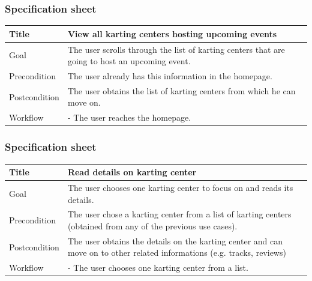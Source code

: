 \documentclass{beamer}
\begin{document}
\begin{frame}
    \frametitle{Specification sheet}
    \begin{table}
        \tiny
        \begin{tabular}{|p{2cm}|p{6cm}|}
        \hline
        Title & \textbf{View all karting centers hosting upcoming events} \\
        \hline
        Goal & The user scrolls through the list of karting centers that are going to host an upcoming event. \\
        \hline
        Precondition & The user already has this information in the homepage.\\
        \hline
        Postcondition & The user obtains the list of karting centers from which he can move on.\\
        \hline
        Workflow &
        - The user reaches the homepage. \\
        \hline
        \end{tabular}
\end{table}
\end{frame}

\begin{frame}
    \frametitle{Specification sheet}
    \begin{table}
        \tiny
        \begin{tabular}{|p{2cm}|p{6cm}|}
        \hline
        Title & \textbf{Read details on karting center} \\
        \hline
        Goal & The user chooses one karting center to focus on and reads its details. \\
        \hline
        Precondition & The user chose a karting center from a list of karting centers (obtained from any of the previous use cases).\\
        \hline
        Postcondition & The user obtains the details on the karting center and can move on to other related informations (e.g. tracks, reviews)\\
        \hline
        Workflow &
        - The user chooses one karting center from a list. \\
        \hline
        \end{tabular}
\end{table}
\end{frame}
\end{document}
